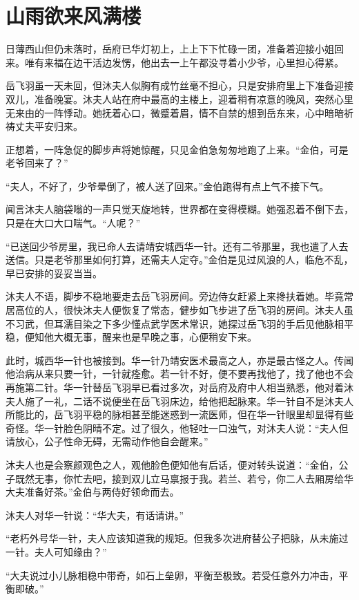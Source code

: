 
\chapter{山雨欲来风满楼}
\label{chap:shan-yu-yu-lai-feng-man-lou}

日薄西山但仍未落时，岳府已华灯初上，上上下下忙碌一团，准备着迎接小姐回来。唯有来福在边干活边发愣，他出去一上午都没寻着小少爷，心里担心得紧。

岳飞羽虽一天未回，但沐夫人似胸有成竹丝毫不担心，只是安排府里上下准备迎接双儿，准备晚宴。沐夫人站在府中最高的主楼上，迎着稍有凉意的晚风，突然心里无来由的一阵悸动。她抚着心口，微蹙着眉，情不自禁的想到岳东来，心中暗暗祈祷丈夫平安归来。

正想着，一阵急促的脚步声将她惊醒，只见金伯急匆匆地跑了上来。“金伯，可是老爷回来了？”

“夫人，不好了，少爷晕倒了，被人送了回来。”金伯跑得有点上气不接下气。

闻言沐夫人脑袋嗡的一声只觉天旋地转，世界都在变得模糊。她强忍着不倒下去，只是在大口大口喘气。“人呢？”

“已送回少爷房里，我已命人去请靖安城西华一针。还有二爷那里，我也遣了人去送信。只是老爷那里如何打算，还需夫人定夺。”金伯是见过风浪的人，临危不乱，早已安排的妥妥当当。

沐夫人不语，脚步不稳地要走去岳飞羽房间。旁边侍女赶紧上来搀扶着她。毕竟常居高位的人，很快沐夫人便恢复了常态，健步如飞步进了岳飞羽的房间。沐夫人虽不习武，但耳濡目染之下多少懂点武学医术常识，她探过岳飞羽的手后见他脉相平稳，便知他大概无事，醒来也是早晚之事，心便稍安下来。

此时，城西华一针也被接到。华一针乃靖安医术最高之人，亦是最古怪之人。传闻他治病从来只要一针，一针就痊愈。若一针不好，便不要再找他了，找了他也不会再施第二针。华一针替岳飞羽早已看过多次，对岳府及府中人相当熟悉，他对着沐夫人施了一礼，二话不说便坐在岳飞羽床边，给他把起脉来。华一针自不是沐夫人所能比的，岳飞羽平稳的脉相甚至能迷惑到一流医师，但在华一针眼里却显得有些奇怪。华一针脸色阴晴不定。过了很久，他轻吐一口浊气，对沐夫人说：“夫人但请放心，公子性命无碍，无需动作他自会醒来。”

沐夫人也是会察颜观色之人，观他脸色便知他有后话，便对转头说道：“金伯，公子既然无事，你忙去吧，接到双儿立马禀报于我。若兰、若兮，你二人去厢房给华大夫准备好茶。”金伯与两侍好领命而去。

沐夫人对华一针说：“华大夫，有话请讲。”

“老朽外号华一针，夫人应该知道我的规矩。但我多次进府替公子把脉，从未施过一针。夫人可知缘由？”

“大夫说过小儿脉相稳中带奇，如石上垒卵，平衡至极致。若受任意外力冲击，平衡即破。”

